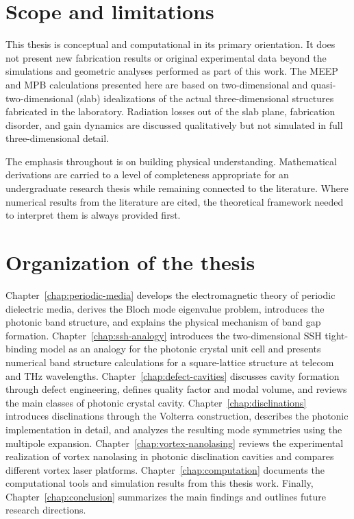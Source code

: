\documentclass[12pt,a4paper,oneside]{book}
\theoremstyle{plain}
\theoremstyle{definition}
\theoremstyle{remark}
\newcommand{\chapref}[1]{Chapter~\ref{#1}}
\begin{document}
\section{Scope and limitations}
\label{sec:scope}

This thesis is conceptual and computational in its primary orientation. It does not present new fabrication results or original experimental data beyond the simulations and geometric analyses performed as part of this work. The MEEP and MPB calculations presented here are based on two-dimensional and quasi-two-dimensional (slab) idealizations of the actual three-dimensional structures fabricated in the laboratory. Radiation losses out of the slab plane, fabrication disorder, and gain dynamics are discussed qualitatively but not simulated in full three-dimensional detail.

The emphasis throughout is on building physical understanding. Mathematical derivations are carried to a level of completeness appropriate for an undergraduate research thesis while remaining connected to the literature. Where numerical results from the literature are cited, the theoretical framework needed to interpret them is always provided first.

\section{Organization of the thesis}
\label{sec:organization}

\chapref{chap:periodic-media} develops the electromagnetic theory of periodic dielectric media, derives the Bloch mode eigenvalue problem, introduces the photonic band structure, and explains the physical mechanism of band gap formation. \chapref{chap:ssh-analogy} introduces the two-dimensional SSH tight-binding model as an analogy for the photonic crystal unit cell and presents numerical band structure calculations for a square-lattice structure at telecom and THz wavelengths. \chapref{chap:defect-cavities} discusses cavity formation through defect engineering, defines quality factor and modal volume, and reviews the main classes of photonic crystal cavity. \chapref{chap:disclinations} introduces disclinations through the Volterra construction, describes the photonic implementation in detail, and analyzes the resulting mode symmetries using the multipole expansion. \chapref{chap:vortex-nanolasing} reviews the experimental realization of vortex nanolasing in photonic disclination cavities and compares different vortex laser platforms. \chapref{chap:computation} documents the computational tools and simulation results from this thesis work. Finally, \chapref{chap:conclusion} summarizes the main findings and outlines future research directions.
\end{document}
